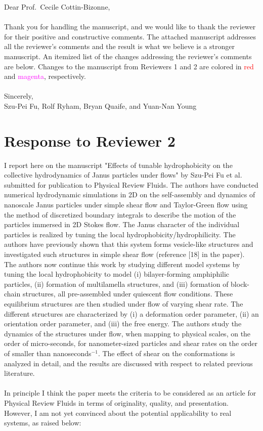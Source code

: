\documentclass[11pt]{article}
\newcommand{\comment}[1]{{\color{blue} #1}}
\begin{document}
\noindent
Dear Prof.~Cecile Cottin-Bizonne,
\\ \\
\noindent
Thank you for handling the manuscript, and we would like to thank the
reviewer for their positive and constructive comments. The attached
manuscript addresses all the reviewer's comments and the result is what
we believe is a stronger manuscript. An itemized list of the changes
addressing the reviewer's comments are below. Changes to the manuscript
from Reviewers 1 and 2 are colored in \textcolor{red}{red} and 
\textcolor{magenta}{magenta}, respectively. \\ \\
\noindent
Sincerely,
\\
\noindent
Szu-Pei Fu, Rolf Ryham, Bryan Quaife, and Yuan-Nan Young

\section*{Response to Reviewer 2}
\comment{
\noindent
I report here on the manuscript "Effects of tunable hydrophobicity on the
collective hydrodynamics of Janus particles under flows" by Szu-Pei Fu et al.
submitted for publication to Physical Review Fluids. The authors have conducted
numerical hydrodynamic simulations in 2D on the self-assembly and dynamics of
nanoscale Janus particles under simple shear flow and Taylor-Green flow using
the method of discretized boundary integrals to describe the motion of the
particles immersed in 2D Stokes flow. The Janus character of the individual
particles is realized by tuning the local hydrophobicity/hydrophilicity. The
authors have previously shown that this system forms vesicle-like structures and
investigated such structures in simple shear flow (reference [18] in the paper).
The authors now continue this work by studying different model systems by tuning
the local hydrophobicity to model (i) bilayer-forming amphiphilic particles,
(ii) formation of multilamella structures, and (iii) formation of block-chain
structures, all pre-assembled under quiescent flow conditions. These equilibrium
structures are then studied under flow of varying shear rate. The different
structures are characterized by (i) a deformation order parameter, (ii) an
orientation order parameter, and (iii) the free energy. The authors study the
dynamics of the structures under flow, when mapping to physical scales, on the
order of micro-seconds, for nanometer-sized particles and shear rates on the
order of smaller than nanoseconds$^{-1}$. The effect of shear on the conformations
is analyzed in detail, and the results are discussed with respect to related
previous literature.\\ \\
In principle I think the paper meets the criteria to be considered as an article
for Physical Review Fluids in terms of originality, quality, and presentation.
However, I am not yet convinced about the potential applicability to real
systems, as raised below:}
\end{document}
